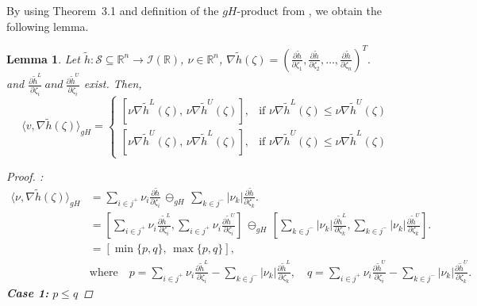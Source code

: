\documentclass[12pt, reqno]{amsart}
\newtheorem{lemma}{Lemma}[section]
\theoremstyle{definition}
\theoremstyle{remark}
\numberwithin{equation}{section}
\begin{document}
By using Theorem~3.1 and definition of the $gH$-product from \cite{Tauheed}, we obtain the following lemma.
\begin{lemma}\label{lemma 3.2 p4} 
    Let $\tilde{h}:\mathcal{S}\subseteq\mathbb{R}^n\rightarrow\mathcal{I}(\mathbb{R})$, \( \mathit{\nu}  \in \mathbb{R}^n \), $
    \nabla \tilde{h}(\mathit{\zeta} ) = \left(\frac{\partial \tilde{h}}{\partial \mathit{\zeta}_1}, \frac{\partial \tilde{h}}{\partial \mathit{\zeta}_2} , \ldots, \frac{\partial \tilde{h}}{\partial \mathit{\zeta}_n} \right)^T.$\\
    and $\frac{\partial \tilde{h}^L}{\partial\mathit{\zeta}_i}~ \textit{and}~\frac{\partial \tilde{h}^U}{\partial\mathit{\zeta}_i}$ exist. Then,
    \begin{equation*}
       \langle v, \nabla \tilde{h}(\mathit{\zeta}) \rangle_{gH} =
\begin{cases}
[ \nu \nabla \tilde{h}^L(\mathit{\zeta}),\, \nu \nabla \tilde{h}^U(\mathit{\zeta}) ], & \text{if } \nu \nabla \tilde{h}^L(\mathit{\zeta}) \leq \nu \nabla \tilde{h}^U(\mathit{\zeta}) \\
[ \nu \nabla \tilde{h}^U(\mathit{\zeta}),\, \nu \nabla \tilde{h}^L(\mathit{\zeta}) ], & \text{if } \nu \nabla \tilde{h}^U(\mathit{\zeta}) \leq \nu \nabla \tilde{h}^L(\mathit{\zeta})
\end{cases} 
    \end{equation*}
    
    \begin{proof}:
        \begin{equation*}
        \begin{aligned}
            \langle \mathit{\nu}, \nabla\tilde{h}(\mathit{\zeta}) \rangle_{gH} &= \sum_{i \in j^+} \mathit{\nu}_i \frac{\partial \tilde{h}}{\partial \mathit{\zeta}_i} \,\ominus_{gH}\, \sum_{k \in j^-} |\mathit{\nu}_k| \frac{\partial \tilde{h}}{\partial \mathit{\zeta}_k}.\\
        &= \left[ \sum_{i \in j^+} \mathit{\nu}_i \frac{\partial \tilde{h}^L}{\partial \mathit{\zeta}_i} , \sum_{i \in j^+} \mathit{\nu}_i \frac{\partial \tilde{h}^U}{\partial \mathit{\zeta}_i} \right]
\,\ominus_{gH}\,
\left[ \sum_{k \in j^-} |\mathit{\nu}_k| \frac{\partial \tilde{h}^L}{\partial \mathit{\zeta}_k} , \sum_{k \in j^-} |\mathit{\nu}_k| \frac{\partial \tilde{h}^U}{\partial \mathit{\zeta}_k} \right].\\
&= \left[
\min \{ p, q \},\, \max \{ p, q \}
\right],
\quad \\
&\text{where}
\quad
p = \sum_{i \in j^+} \mathit{\nu}_i \frac{\partial \tilde{h}^L}{\partial \mathit{\zeta}_i} - \sum_{k \in j^-} |\mathit{\nu}_k| \frac{\partial \tilde{h}^L}{\partial \mathit{\zeta}_k},
\quad
q = \sum_{i \in j^+} \mathit{\nu}_i \frac{\partial \tilde{h}^U}{\partial \mathit{\zeta}_i} - \sum_{k \in j^-} |\mathit{\nu}_k| \frac{\partial \tilde{h}^U}{\partial \mathit{\zeta}_k}.
        \end{aligned}
    \end{equation*}
\textbf{Case 1:} \( p \leq q \)


\end{proof}
\end{lemma}
\end{document}
